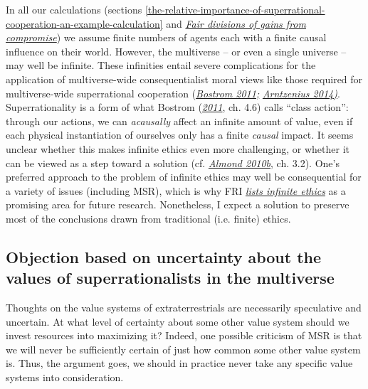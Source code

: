 In all our calculations (sections
\ref{the-relative-importance-of-superrational-cooperation-an-example-calculation} and
\protect\hyperlink{_8pf5otrvp6f4}{\emph{Fair divisions of gains from compromise}}) we assume finite
numbers of agents each with a finite causal influence on their world. However, the multiverse -- or
even a single universe -- may well be infinite. These infinities entail severe complications for the
application of multiverse-wide consequentialist moral views like those required for
multiverse-wide superrational cooperation
(\href{http://www.nickbostrom.com/ethics/infinite.pdf}{\emph{Bostrom
2011;}}
\href{http://lukemuehlhauser.com/wp-content/uploads/Arntzenius-Utilitarianism-decision-theory-and-eternity.pdf}{\emph{Arntzenius
2014)}}. Superrationality is a form of what Bostrom
(\href{http://www.nickbostrom.com/ethics/infinite.pdf}{\emph{2011}}, ch.
4.6) calls ``class action'': through our actions, we can
\emph{acausally} affect an infinite amount of value, even if each
physical instantiation of ourselves only has a finite \emph{causal}
impact. It seems unclear whether this makes infinite ethics even more
challenging, or whether it can be viewed as a step toward a solution
(cf.
\href{https://web.archive.org/web/20120310010225/http://www.paul-almond.com/Correlation2.pdf}{\emph{Almond
2010b}}, ch. 3.2). One's preferred approach to the problem of infinite
ethics may well be consequential for a variety of issues (including
MSR), which is why FRI
\href{https://foundational-research.org/infinity-in-ethics/}{\emph{lists
infinite ethics}} as a promising area for future research. Nonetheless,
I expect a solution to preserve most of the conclusions drawn from
traditional (i.e. finite) ethics.

\hypertarget{objection-based-on-uncertainty-about-the-values-of-superrationalists-in-the-multiverse}{\subsection{Objection
based on uncertainty about the values of superrationalists in the
multiverse}\label{objection-based-on-uncertainty-about-the-values-of-superrationalists-in-the-multiverse}}

Thoughts on the value systems of extraterrestrials are necessarily
speculative and uncertain. At what level of certainty about some other
value system should we invest resources into maximizing it? Indeed, one
possible criticism of MSR is that we will never be sufficiently certain
of just how common some other value system is. Thus, the argument goes,
we should in practice never take any specific value systems into
consideration.

